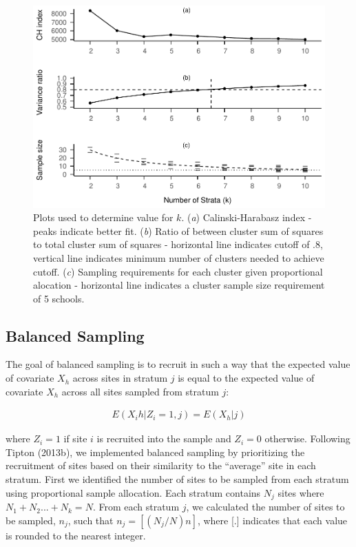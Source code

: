 \documentclass[man,floatsintext]{apa6}
\begin{document}
\begin{figure}
\centering
\includegraphics{GenSamp-Paper_files/figure-latex/fig-k-plots-1.pdf}
\caption{\label{fig:fig-k-plots}Plots used to determine value for \(k\). (\emph{a}) Calinski-Harabasz index - peaks indicate better fit. (\emph{b}) Ratio of between cluster sum of squares to total cluster sum of squares - horizontal line indicates cutoff of .8, vertical line indicates minimum number of clusters needed to achieve cutoff. (\emph{c}) Sampling requirements for each cluster given proportional alocation - horizontal line indicates a cluster sample size requirement of 5 schools.}
\end{figure}

\hypertarget{balanced-sampling}{%
\subsection{Balanced Sampling}\label{balanced-sampling}}

The goal of balanced sampling is to recruit in such a way that the expected value of covariate \(X_h\) across sites in stratum \(j\) is equal to the expected value of covariate \(X_h\) across all sites sampled from stratum \(j\):

\begin{align}
  E(X_ih|Z_i = 1, j) = E(X_h|j)
\end{align}

where \(Z_i = 1\) if site \(i\) is recruited into the sample and \(Z_i = 0\) otherwise. Following Tipton (2013b), we implemented balanced sampling by prioritizing the recruitment of sites based on their similarity to the \enquote{average} site in each stratum. First we identified the number of sites to be sampled from each stratum using proportional sample allocation. Each stratum contains \(N_j\) sites where \(N_1 + N_2 ... + N_k = N\). From each stratum \(j\), we calculated the number of sites to be sampled, \(n_j\), such that \(n_j = [(N_j/N)n]\), where {[}.{]} indicates that each value is rounded to the nearest integer.
\end{document}
